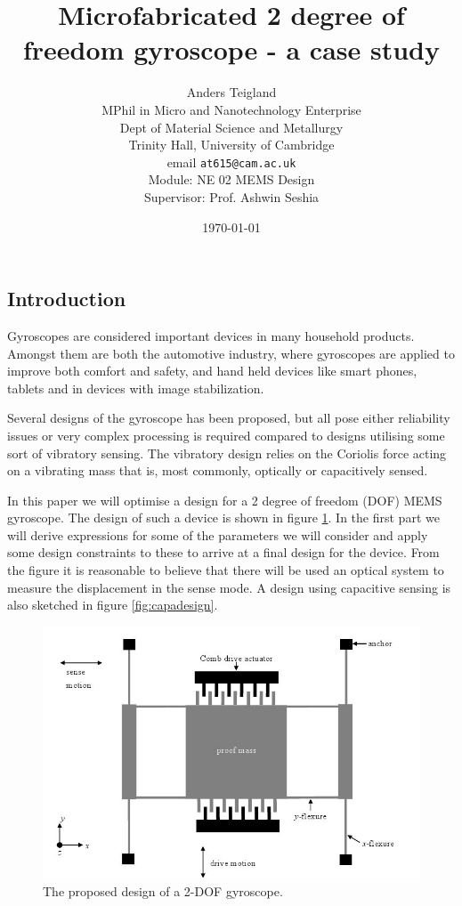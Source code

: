 \documentclass[12pt,a4paper,titlepage]{article}
\title{Microfabricated 2 degree of freedom gyroscope - a case study}
\date{\today}
\author{Anders Teigland\\ MPhil in Micro and Nanotechnology Enterprise \\ Dept of Material Science and Metallurgy\\ Trinity Hall, University of Cambridge\\ email \texttt{at615@cam.ac.uk}\\ Module: NE 02 MEMS Design \\ Supervisor: Prof. Ashwin Seshia}
\begin{document}
\begin{spacing}{1.1}
\maketitle
\section{Introduction}
Gyroscopes are considered important devices in many household products. Amongst them are both the automotive industry, where gyroscopes are applied to improve both comfort and safety, and hand held devices like smart phones, tablets and in devices with image stabilization\cite{Xie03}.

Several designs of the gyroscope has been proposed, but all pose either reliability issues or very complex processing is required compared to designs utilising some sort of vibratory sensing. The vibratory design relies on the Coriolis force acting on a vibrating mass that is, most commonly, optically or capacitively sensed.

In this paper we will optimise a design for a 2 degree of freedom (DOF) MEMS gyroscope. The design of such a device is shown in figure \ref{fig:design}. In the first part we will derive expressions for some of the parameters we will consider and apply some design constraints to these to arrive at a final design for the device. From the figure it is reasonable to believe that there will be used an optical system to measure the displacement in the sense mode. A design using capacitive sensing is also sketched in figure \ref{fig:capadesign}.
\begin{figure}[htb]
\centering
\includegraphics[width=0.8\linewidth]{Design}
\caption{The proposed design of a 2-DOF gyroscope.}
\label{fig:design}
\end{figure}


\end{spacing}
\end{document}
